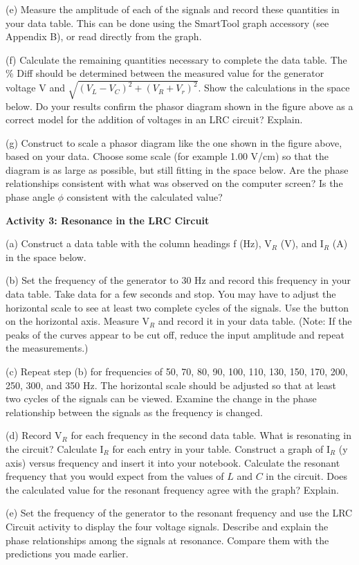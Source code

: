 (e) Measure the amplitude of each of the signals and record these
quantities in your data table. This can be done using the SmartTool graph
accessory (see Appendix B), or read directly from the graph.

(f) Calculate the remaining quantities necessary to complete the data
table. The \% Diff should be determined between the measured value
for the generator voltage V and \( \sqrt{(V_{L}-V_{C})^{2}+(V_{R}+V_{r})^{2}} \).
Show the calculations in the space below. Do your
results confirm the phasor diagram shown in the figure above as a
correct model for the addition of voltages in an LRC circuit? Explain.
\vspace{4in}

(g) Construct to scale a phasor diagram like the one shown in the
figure above, based on your data. Choose some scale (for example
1.00 V/cm) so that the diagram is as large as possible, but still fitting 
in the space below. Are the phase relationships consistent
with what was observed on the computer screen? Is the phase angle
\( \phi  \) consistent with the calculated value?
\vspace{3.5in}

\textbf{Activity 3: Resonance in the LRC Circuit }

(a) Construct a data table with the column headings f (Hz),
V\( _{R} \) (V), and I\(_R \) (A) in the space below.
\vspace{3in}

(b) Set the frequency of the generator to 30 Hz and record this
frequency in your data table. Take data for a few seconds and stop. You may
have to adjust the horizontal scale to see at least two complete
cycles of the signals. Use the button on the horizontal axis.
Measure V\( _{R} \)  and record it in your data table. (Note: If the peaks 
of the curves appear
to be cut off, reduce the input amplitude and repeat the measurements.)

(c) Repeat step (b) for frequencies of 50, 70, 80, 90,
100, 110, 130, 150, 170, 200, 250, 300, and 350 Hz. The \textbf{}horizontal scale \textbf{}should
be adjusted so that at least two cycles of the signals can be viewed.
Examine the change in the phase relationship between the signals as
the frequency is changed. 

(d) Record V\( _{R} \)  for each
frequency in the second data table. What is resonating in the
circuit? Calculate I\(_R\) for each entry in your table.
Construct a graph of I\( _{R} \)
(y axis) versus frequency and insert it into your notebook. Calculate
the resonant frequency that you would expect from the values of $L$
and $C$ in the circuit. Does the calculated value for the resonant frequency
agree with the graph? Explain.
\vspace{40mm}

(e) Set the frequency of the generator to the resonant
frequency and use the LRC Circuit activity to display the
four voltage signals. Describe and explain the phase relationships
among the signals at resonance. Compare them with the predictions
you made earlier. \vspace{20mm}

